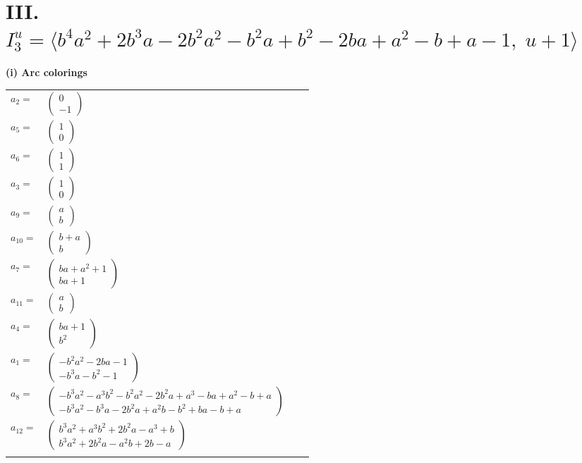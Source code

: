\documentclass[1p]{elsarticle_modified}
\theoremstyle{definition}
\begin{document}
\centering \section*{III. $I^u_{3}= \langle b^4 a^2+2 b^3 a-2 b^2 a^2- b^2 a+b^2-2 b a+a^2- b+a-1,\;u+1 \rangle$}
\flushleft \textbf{(i) Arc colorings}\\
\begin{tabular}{m{7pt} m{180pt} m{7pt} m{180pt} }
\flushright $a_{2}=$&$\begin{pmatrix}0\\-1\end{pmatrix}$ \\
\flushright $a_{5}=$&$\begin{pmatrix}1\\0\end{pmatrix}$ \\
\flushright $a_{6}=$&$\begin{pmatrix}1\\1\end{pmatrix}$ \\
\flushright $a_{3}=$&$\begin{pmatrix}1\\0\end{pmatrix}$ \\
\flushright $a_{9}=$&$\begin{pmatrix}a\\b\end{pmatrix}$ \\
\flushright $a_{10}=$&$\begin{pmatrix}b+a\\b\end{pmatrix}$ \\
\flushright $a_{7}=$&$\begin{pmatrix}b a+a^2+1\\b a+1\end{pmatrix}$ \\
\flushright $a_{11}=$&$\begin{pmatrix}a\\b\end{pmatrix}$ \\
\flushright $a_{4}=$&$\begin{pmatrix}b a+1\\b^2\end{pmatrix}$ \\
\flushright $a_{1}=$&$\begin{pmatrix}- b^2 a^2-2 b a-1\\- b^3 a- b^2-1\end{pmatrix}$ \\
\flushright $a_{8}=$&$\begin{pmatrix}- b^3 a^2- a^3 b^2- b^2 a^2-2 b^2 a+a^3- b a+a^2- b+a\\- b^3 a^2- b^3 a-2 b^2 a+a^2 b- b^2+b a- b+a\end{pmatrix}$ \\
\flushright $a_{12}=$&$\begin{pmatrix}b^3 a^2+a^3 b^2+2 b^2 a- a^3+b\\b^3 a^2+2 b^2 a- a^2 b+2 b- a\end{pmatrix}$\\&\end{tabular}
\end{document}
